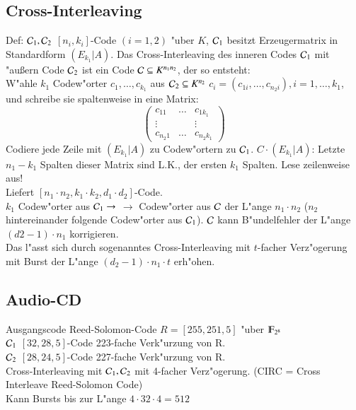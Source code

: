 \subsection{Cross-Interleaving}
Def: $\mathcal{C}_1, \mathcal{C}_2$ $[n_i,k_i]$-Code $(i=1,2)$ "uber $K$, $\mathcal{C}_1$ besitzt Erzeugermatrix in Standardform $(E_{k_1} | A)$. Das Cross-Interleaving des inneren Codes $\mathcal{C}_1$ mit "au\ss ern Code $\mathcal{C}_2$ ist ein Code $\mathcal{C} \subseteq K^{n_1 n_2}$, der so entsteht:\\
W"ahle $k_1$ Codew"orter $c_1,\ldots,c_{k_1}$ aus $\mathcal{C}_2 \subseteq K^{n_2}$ $c_i=(c_{1i}, \ldots, c_{n_2 i}), i=1,\ldots, k_1$, und schreibe sie spaltenweise in eine Matrix:
\[
\begin{pmatrix}
c_{11} & \ldots & c_{1k_1} \\ 
\vdots &  & \vdots \\ 
c_{n_2 1} & \ldots & c_{n_2 k_1}
\end{pmatrix} 
\]%
Codiere jede Zeile mit $(E_{k_1} | A)$ zu Codew"ortern zu $\mathcal{C}_1$. $C \cdot (E_{k_1} | A)$: Letzte $n_1-k_1$ Spalten dieser Matrix sind L.K., der ersten $k_1$ Spalten. %
Lese zeilenweise aus!\\
Liefert $[n_1 \cdot n_2, k_1 \cdot k_2, d_1 \cdot d_2]$-Code.\\ $k_1$ Codew"orter aus $\mathcal{C}_1 \rightarrow$  $\rightarrow$ Codew"orter aus $\mathcal{C}$ der L"ange $n_1\cdot n_2$ ($n_2$ hintereinander folgende Codew"orter aus $\mathcal{C}_1$). $\mathcal{C}$ kann B"undelfehler der L"ange $(d2-1)\cdot n_1$ korrigieren.\\
Das l"asst sich durch sogenanntes Cross-Interleaving mit $t$-facher Verz"ogerung mit Burst der L"ange $(d_2-1) \cdot n_1 \cdot t$ erh"ohen.
\subsection{Audio-CD}
Ausgangscode Reed-Solomon-Code $R=[255,251,5]$ "uber $\F_{2^8}$\\
$\mathcal{C}_1$ $[32,28,5]$-Code 223-fache Verk"urzung von R.\\
$\mathcal{C}_2$ $[28,24,5]$-Code 227-fache Verk"urzung von R.\\
Cross-Interleaving mit $\mathcal{C}_1,\mathcal{C}_2$ mit 4-facher Verz"ogerung. (CIRC = Cross Interleave Reed-Solomon Code)\\
Kann Bursts bis zur L"ange $4\cdot 32 \cdot 4=512$
